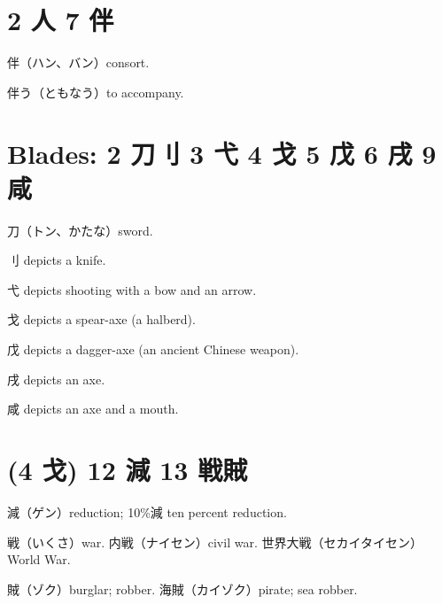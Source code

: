 \section{2 人 7 伴}

伴（ハン、バン）consort.

伴う（ともなう）to accompany.

\section{Blades: 2 刀刂 3 弋 4 戈 5 戊 6 戌 9 咸}

刀（トン、かたな）sword.

刂 depicts a knife.

弋 depicts shooting with a bow and an arrow.

戈 depicts a spear-axe (a halberd).

戊 depicts a dagger-axe (an ancient Chinese weapon).

戌 depicts an axe.

咸 depicts an axe and a mouth.

\section{(4 戈) 12 減 13 戦賊}

減（ゲン）reduction; 10\%減 ten percent reduction.

戦（いくさ）war.
内戦（ナイセン）civil war.
世界大戦（セカイタイセン）World War.

賊（ゾク）burglar; robber.
海賊（カイゾク）pirate; sea robber.
